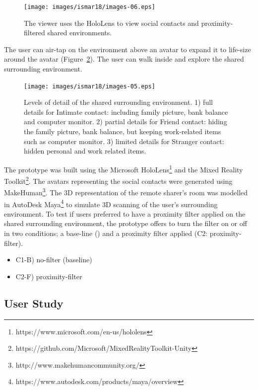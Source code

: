 \begin{figure}[H]
    \centering
    \texttt{[image: images/ismar18/images-06.eps]}
    \caption{The viewer uses the HoloLens to view social contacts and proximity-filtered shared environments.}
    \label{fig:environment:setup}
\end{figure}

The user can air-tap on the environment above an avatar to expand it to life-size around the avatar (Figure~\ref{fig:environment:environment-levels}). The user can walk inside and explore the shared surrounding environment.

\begin{figure}[H]
  \centering
  \texttt{[image: images/ismar18/images-05.eps]}
  \caption{Levels of detail of the shared surrounding environment. 1) full details for Intimate contact: including family picture, bank balance and computer monitor. 2) partial details for Friend contact: hiding the family picture, bank balance, but keeping work-related items such as computer monitor. 3) limited details for Stranger contact: hidden personal and work related items.}
  \label{fig:environment:environment-levels}
\end{figure}


The prototype was built using the Microsoft HoloLens\footnote{https://www.microsoft.com/en-us/hololens} and the Mixed Reality Toolkit\footnote{https://github.com/Microsoft/MixedRealityToolkit-Unity}. The avatars representing the social contacts were generated using MakeHuman\footnote{http://www.makehumancommunity.org/}. The 3D representation of the remote sharer's room was modelled in AutoDesk Maya\footnote{https://www.autodesk.com/products/maya/overview} to simulate 3D scanning of the user's surrounding environment. To test if users preferred to have a proximity filter applied on the shared surrounding environment, the prototype offers to turn the filter on or off in two conditions; a base-line () and a proximity filter applied (C2: proximity-filter).

\begin{itemize}
    \item C1-B) no-filter (baseline)
    \item C2-F) proximity-filter
\end{itemize}{}

\subsection{User Study}

